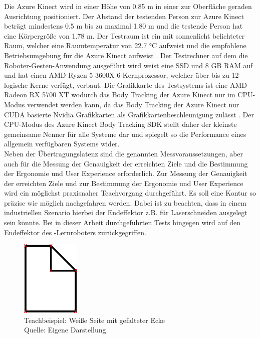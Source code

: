 Die Azure Kinect wird in einer Höhe von \num{0,85} m in einer zur Oberfläche geraden Ausrichtung positioniert. Der Abstand der testenden Person zur Azure Kinect beträgt mindestens \num{0,5} m bis zu maximal \num{1,80} m und die testende Person hat eine Körpergröße von \num{1,78} m. Der Testraum ist ein mit sonnenlicht belichteter Raum, welcher eine Raumtemperatur von \num{22,7} °C aufweist und die empfohlene Betriebsumgebung für die Azure Kinect aufweist \cite{tesych_azure_nodate}. Der Testrechner auf dem die Roboter-Gesten-Anwendung ausgeführt wird weist eine SSD und 8 GB RAM auf und hat einen AMD Ryzen 5 3600X 6-Kernprozessor, welcher über bis zu 12 logische Kerne verfügt, verbaut. Die Grafikkarte des Testsystems ist eine AMD Radeon RX 5700 XT wodurch das Body Tracking der Azure Kinect nur im CPU-Modus verwendet werden kann, da das Body Tracking der Azure Kinect nur CUDA basierte Nvidia Grafikkarten als Grafikkartenbeschleunigung zulässt \cite{encausse_body_nodate}. Der CPU-Modus des Azure Kinect Body Tracking SDK stellt daher der kleinste gemeinsame Nenner für alle Systeme dar und spiegelt so die Performance eines allgemein verfügbaren Systems wider.\\

Neben der Übertragungslatenz sind die genannten Messvoraussetzungen, aber auch für die Messung der Genauigkeit der erreichten Ziele und die Bestimmung der Ergonomie und User Experience erforderlich. Zur Messung der Genauigkeit der erreichten Ziele und zur Bestimmung der Ergonomie und User Experience wird ein möglichst praxisnaher Teachvorgang durchgeführt. Es soll eine Kontur so präzise wie möglich nachgefahren werden. Dabei ist zu beachten, dass in einem industriellen Szenario hierbei der Endeffektor z.B. für Laserschneiden ausgelegt sein könnte. Bei in dieser Arbeit durchgeführten Tests hingegen wird auf den Endeffektor des -Lernroboters zurückgegriffen.

\begin{figure}[htb]
	\centering
	\includegraphics[width=0.25\textwidth]{images/loesungsweg/white-page-with-folded-corner}
	\caption[Teachbeispiel: Weiße Seite mit gefalteter Ecke]{Teachbeispiel: Weiße Seite mit gefalteter Ecke\\Quelle: Eigene Darstellung}
	\label{fig:white_page_with_folded_corner}
\end{figure}
\FloatBarrier


